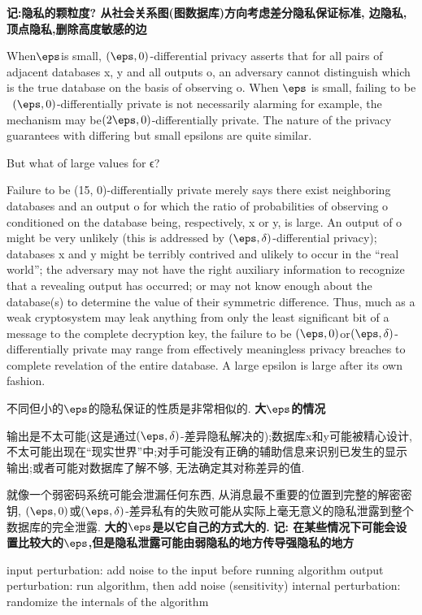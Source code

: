 \textbf{记:隐私的颗粒度? 从社会关系图(图数据库)方向考虑差分隐私保证标准, 边隐私,顶点隐私,删除高度敏感的边}



When$ \eps $is small, $(\eps, 0)$-differential privacy asserts that for all pairs of adjacent databases x, y and all outputs o, an adversary cannot distinguish which is the true database on the basis of observing o. When $\eps$ is small, failing to be ~$(\eps, 0)$-differentially private is not necessarily alarming for example, the mechanism may be$ (2\eps, 0)$-differentially private. The nature of the privacy guarantees with differing but small epsilons are quite similar. 

But what of large values for ϵ? 

Failure to be (15, 0)-differentially private merely says there exist neighboring databases and an output o for which the ratio of probabilities of observing o conditioned on the database being, respectively, x or y, is large. An output of o might be very unlikely (this is addressed by $(\eps, \delta)$-differential privacy); databases x and y might be terribly contrived and ulikely to occur in the “real world”; 
the adversary may not have the right auxiliary information to recognize that a revealing output has occurred; 
or may not know enough about the database(s) to determine the value of their symmetric difference. 
Thus, much as a weak cryptosystem may leak anything from only the least significant bit of a message to the complete decryption key, the failure to be $(\eps, 0)$or$(\eps,\delta)$-differentially private may range from effectively meaningless privacy breaches to complete revelation of the entire database.
 A large epsilon is large after its own fashion. 
 
不同但小的$\eps$的隐私保证的性质是非常相似的. 
\textbf{大$\eps$的情况}
 
输出是不太可能(这是通过$(\eps, \delta)$-差异隐私解决的);数据库x和y可能被精心设计, 不太可能出现在“现实世界”中;对手可能没有正确的辅助信息来识别已发生的显示输出;或者可能对数据库了解不够, 无法确定其对称差异的值. 

就像一个弱密码系统可能会泄漏任何东西, 从消息最不重要的位置到完整的解密密钥, $(\eps, 0)$或$(\eps, \delta)$-差异私有的失败可能从实际上毫无意义的隐私泄露到整个数据库的完全泄露. 
\textbf{大的$\eps$是以它自己的方式大的. }
\textbf{记: 在某些情况下可能会设置比较大的$\eps$,但是隐私泄露可能由弱隐私的地方传导强隐私的地方}

input perturbation: add noise to the input before running algorithm
output perturbation: run algorithm, then add noise (sensitivity)
internal perturbation: randomize the internals of the algorithm

